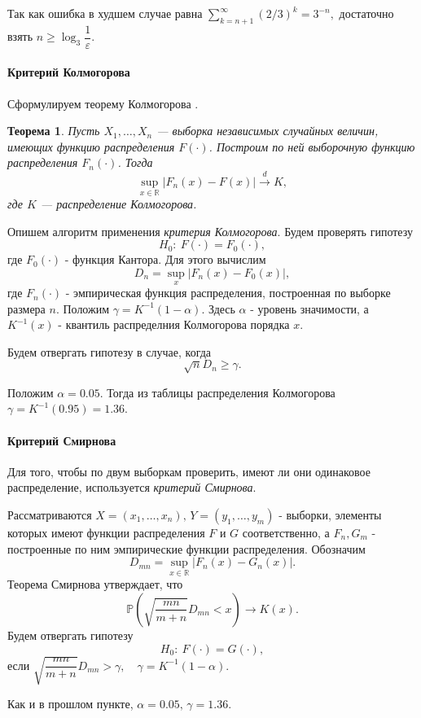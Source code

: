 \documentclass[16pt]{article}
\newtheorem{Th}{Теорема}
\newcommand\Real{\mathbb{R}}
\newcommand\A{(\cdot)}
\begin{document}
Так как ошибка в худшем случае равна
$ \sum\limits_{k=n+1}^\infty\left(2/3\right)^{k} = 3^{-n},$
достаточно взять $n \geq \log_3 \dfrac{1}{\varepsilon}$.

\paragraph{Критерий Колмогорова}
Сформулируем теорему Колмогорова \cite{Kolm}. 
\begin{Th}
Пусть $X_1, \ldots, X_n$ --- выборка независимых случайных величин, имеющих функцию распределения $F\A$. Построим по ней выборочную функцию распределения $F_n\A$. Тогда $$\sup_{x \in \Real}|F_n(x) - F(x)| \overset{d}{\to} K,$$
где $K$ --- распределение Колмогорова.
\end{Th}

Опишем алгоритм применения {\it критерия Колмогорова}. Будем проверять гипотезу
$$H_0\colon \ F(\cdot) = F_0(\cdot),$$
где $F_0(\cdot)$ - функция Кантора. Для этого вычислим
$$D_n = \sup_x|F_n(x) - F_0(x)|,$$
где $F_n(\cdot)$ - эмпирическая функция распределения, построенная по выборке размера $n$. Положим $\gamma = K^{-1}(1-\alpha)$. Здесь $\alpha$ - уровень значимости, а $K^{-1}(x)$ - квантиль распределния Колмогорова порядка $x$. 

Будем отвергать гипотезу в случае, когда
$$\sqrt{n}D_n \geq \gamma.$$

Положим $\alpha = 0.05$. Тогда из таблицы распределения Колмогорова $\gamma = K^{-1}(0.95) = 1.36$.

\paragraph{Критерий Смирнова} Для того, чтобы по двум выборкам проверить, имеют ли они одинаковое распределение, используется {\it критерий Смирнова}. 

Рассматриваются $X = (x_1, \ldots, x_n),\, Y = (y_1, \ldots, y_m)$ - выборки, элементы которых имеют функции распределения $F$ и $G$ соответственно, а $F_n, G_m$ - построенные по ним эмпирические функции распределения. Обозначим 
$$D_{mn} = \sup_{x \in \mathbb{R}}|F_n(x) - G_n(x)|.$$
Теорема Смирнова \cite{Smir} утверждает, что
$$\mathbb{P}\left(\sqrt{\frac{mn}{m+n}}D_{mn} < x\right) \to K(x).$$
Будем отвергать гипотезу
$$H_0\colon \ F(\cdot) = G(\cdot),$$
если 
$\sqrt{\dfrac{mn}{m+n}}D_{mn} > \gamma, \quad \gamma = K^{-1}(1 - \alpha).$

Как и в прошлом пункте, $\alpha = 0.05,\, \gamma = 1.36$.
\end{document}
